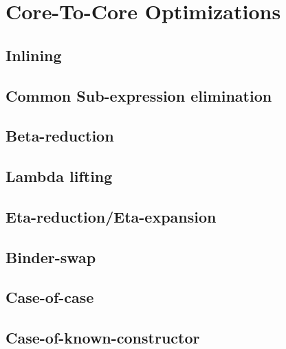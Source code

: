 \documentclass[]{lwnovathesis}
\begin{document}

\section{Core-To-Core Optimizations}


\subsection{Inlining}

\subsection{Common Sub-expression elimination}

\subsection{Beta-reduction}
\subsection{Lambda lifting}
\subsection{Eta-reduction/Eta-expansion}

\subsection{Binder-swap}

\subsection{Case-of-case}
\subsection{Case-of-known-constructor}
\end{document}
